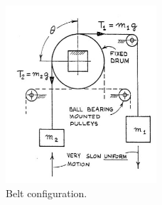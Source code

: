 \begin{figure}[H]
\centering
\includegraphics[width=0.5\textwidth]{chapters/lab2/setup}
\caption{Belt configuration.}
\label{fig:mesh1}
\end{figure}